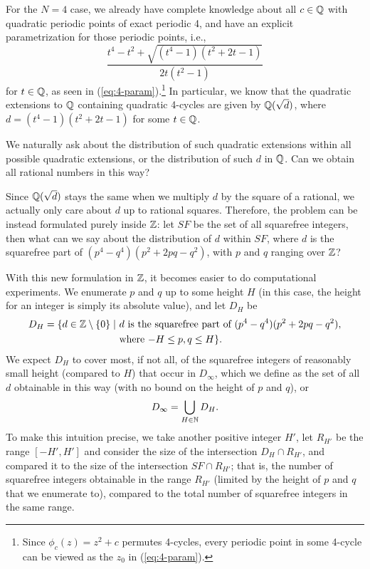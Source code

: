 For the $N = 4$ case, we already have complete knowledge about all $c
\in \mathbb{Q}$ with quadratic periodic points of exact periodic 4, and have
an explicit parametrization for those periodic points, i.e.,
\[
\frac{t^4 - t^2 + \sqrt{(t^4 - 1)(t^2 + 2t - 1)}}{2t(t^2 - 1)}
\]
for $t \in \mathbb{Q}$, as seen in (\ref{eq:4-param}).\footnote{%
  Since $\phi_c(z) = z^2 + c$ permutes 4-cycles, every periodic point
  in some 4-cycle can be viewed as the $z_0$ in (\ref{eq:4-param}).}
In particular, we know that the quadratic extensions to $\mathbb{Q}$
containing quadratic 4-cycles are given by $\mathbb{Q}(\sqrt{d})$, where $d =
(t^4 - 1)(t^2 + 2t - 1)$ for some $t \in \mathbb{Q}$.

We naturally ask about the distribution of such quadratic extensions
within all possible quadratic extensions, or the distribution of such
$d$ in $\mathbb{Q}$. Can we obtain all rational numbers in this way?

Since $\mathbb{Q}(\sqrt{d})$ stays the same when we multiply $d$ by the square
of a rational, we actually only care about $d$ up to rational
squares. Therefore, the problem can be instead formulated purely
inside $\mathbb{Z}$: let $SF$ be the set of all squarefree integers, then what
can we say about the distribution of $d$ within $SF$, where $d$ is the
squarefree part of $(p^4 - q^4)(p^2 + 2pq - q^2)$, with $p$ and $q$
ranging over $\mathbb{Z}$?

With this new formulation in $\mathbb{Z}$, it becomes easier to do
computational experiments. We enumerate $p$ and $q$ up to some height
$H$ (in this case, the height for an integer is simply its absolute
value), and let $D_H$ be
\[
\begin{aligned}
  D_H = \{ d \in \mathbb{Z} \setminus \left\{0\right\} \mid\ &
  \text{$d$ is the squarefree part of $(p^4 - q^4)(p^2 + 2pq - q^2)$},
  \\
  & \text{where $-H \le p, q \le H$}\}.
\end{aligned}
\]
We expect $D_H$ to cover most, if not all, of the squarefree integers
of reasonably small height (compared to $H$) that occur in $D_\infty$,
which we define as the set of all $d$ obtainable in this way (with no
bound on the height of $p$ and $q$), or
\[
D_\infty = \bigcup_{H \in \mathbb{N}} D_H.
\]
To make this intuition precise, we take another positive integer $H'$,
let $R_{H'}$ be the range $[-H', H']$ and consider the size of the
intersection $D_H \cap R_{H'}$, and compared it to the size of the
intersection $SF \cap R_{H'}$; that is, the number of squarefree
integers obtainable in the range $R_{H'}$ (limited by the height of
$p$ and $q$ that we enumerate to), compared to the total number of
squarefree integers in the same range.

